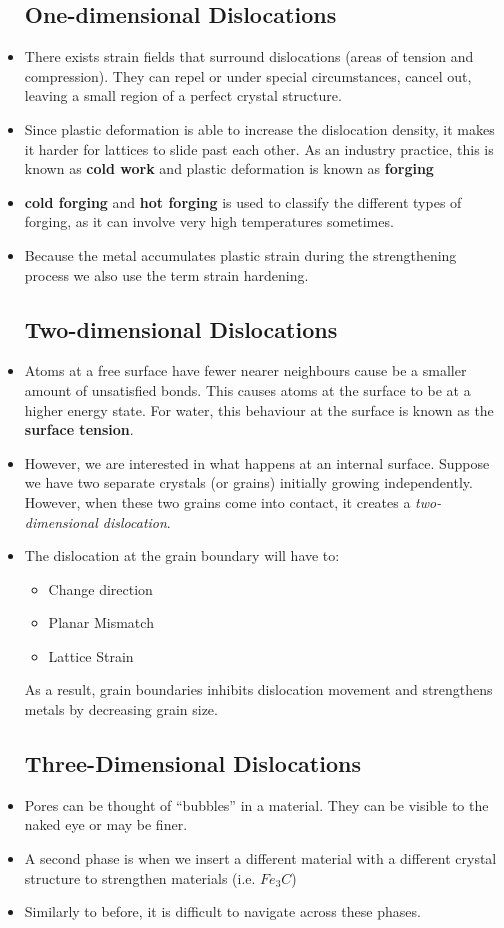 \begin{itemize}
    \subsection{One-dimensional Dislocations}
    \item There exists strain fields that surround dislocations (areas of tension and compression). They can repel or under special circumstances, cancel out, leaving a small region of a perfect crystal structure.
    \item Since plastic deformation is able to increase the dislocation density, it makes it harder for lattices to slide past each other. As an industry practice, this is known as \textbf{cold work} and plastic deformation is known as \textbf{forging}
    \item \textbf{cold forging} and \textbf{hot forging} is used to classify the different types of forging, as it can involve very high temperatures sometimes.
    \item Because the metal accumulates plastic strain during the strengthening process we also use the term strain hardening. 
    \subsection{Two-dimensional Dislocations}
    \item Atoms at a free surface have fewer nearer neighbours cause be a smaller amount of unsatisfied bonds. This causes atoms at the surface to be at a higher energy state. For water, this behaviour at the surface is known as the \textbf{surface tension}.
    \item However, we are interested in what happens at an internal surface. Suppose we have two separate crystals (or grains) initially growing independently. However, when these two grains come into contact, it creates a \textit{two-dimensional dislocation}.
    \item The dislocation at the grain boundary will have to:
    \begin{itemize}
        \item Change direction
        \item Planar Mismatch
        \item Lattice Strain
    \end{itemize}
    As a result, grain boundaries inhibits dislocation movement and strengthens metals by decreasing grain size.
    \subsection{Three-Dimensional Dislocations}
    \item Pores can be thought of ``bubbles'' in a material. They can be visible to the naked eye or may be finer.
    \item A second phase is when we insert a different material with a different crystal structure to strengthen materials (i.e. $Fe_3C$)
    \item Similarly to before, it is difficult to navigate across these phases.
\end{itemize}